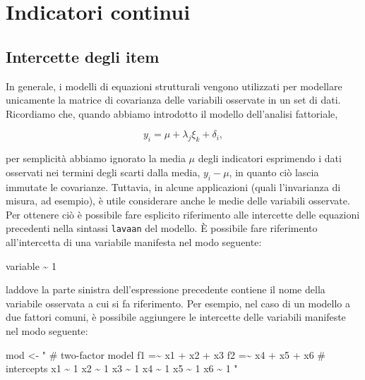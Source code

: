 \documentclass[
  11pt,
]{krantz}
\makeatletter
\newenvironment{Shaded}{\begin{snugshade}}{\end{snugshade}}
\newcommand{\DecValTok}[1]{\textcolor[rgb]{0.06,0.06,0.06}{#1}}
\newcommand{\NormalTok}[1]{#1}
\newcommand{\OtherTok}[1]{\textcolor[rgb]{0.37,0.37,0.37}{#1}}
\newcommand{\SpecialCharTok}[1]{\textcolor[rgb]{0,0,0}{#1}}
\newcommand{\StringTok}[1]{\textcolor[rgb]{0.5,0.5,0.5}{#1}}
\newenvironment{kframe}{%
\medskip{}
\setlength{\fboxsep}{.8em}
 \def\at@end@of@kframe{}%
 \ifinner\ifhmode%
  \def\at@end@of@kframe{\end{minipage}}%
  \begin{minipage}{\columnwidth}%
 \fi\fi%
 \def\FrameCommand##1{\hskip\@totalleftmargin \hskip-\fboxsep
 \colorbox{shadecolor}{##1}\hskip-\fboxsep
     \hskip-\linewidth \hskip-\@totalleftmargin \hskip\columnwidth}%
 \MakeFramed {\advance\hsize-\width
   \@totalleftmargin\z@ \linewidth\hsize
   \@setminipage}}%
 {\par\unskip\endMakeFramed%
 \at@end@of@kframe}
\renewenvironment{Shaded}{\begin{kframe}}{\end{kframe}}
\theoremstyle{definition}
\theoremstyle{definition}
\theoremstyle{definition}
\theoremstyle{definition}
\theoremstyle{remark}
\makeatother
\begin{document}
\hypertarget{indicatori-continui}{%
\section{Indicatori continui}\label{indicatori-continui}}

\hypertarget{intercette-degli-item}{%
\subsection{Intercette degli item}\label{intercette-degli-item}}

In generale, i modelli di equazioni strutturali vengono utilizzati per modellare unicamente la matrice di covarianza delle variabili osservate in un set di dati. Ricordiamo che, quando abbiamo introdotto il modello dell'analisi fattoriale,

\[
y_i = \mu + \lambda_j \xi_k + \delta_i,
\]

per semplicità abbiamo ignorato la media \(\mu\) degli indicatori esprimendo i dati osservati nei termini degli scarti dalla media, \(y_i -\mu\), in quanto ciò lascia immutate le covarianze. Tuttavia, in alcune applicazioni (quali l'invarianza di misura, ad esempio), è utile considerare anche le medie delle variabili osservate. Per ottenere ciò è possibile fare esplicito riferimento alle intercette delle equazioni precedenti nella sintassi \texttt{lavaan} del modello. È possibile fare riferimento all'intercetta di una variabile manifesta nel modo seguente:

\begin{Shaded}
\begin{Highlighting}[]
\NormalTok{variable }\SpecialCharTok{\textasciitilde{}} \DecValTok{1}
\end{Highlighting}
\end{Shaded}

laddove la parte sinistra dell'espressione precedente contiene il nome della variabile osservata a cui si fa riferimento. Per esempio, nel caso di un modello a due fattori comuni, è possibile aggiungere le intercette delle variabili manifeste nel modo seguente:

\begin{Shaded}
\begin{Highlighting}[]
\NormalTok{mod }\OtherTok{\textless{}{-}} \StringTok{"}
\StringTok{  \# two{-}factor model}
\StringTok{  f1 =\textasciitilde{} x1 + x2 + x3}
\StringTok{  f2 =\textasciitilde{} x4 + x5 + x6}
\StringTok{  \# intercepts}
\StringTok{  x1 \textasciitilde{} 1}
\StringTok{  x2 \textasciitilde{} 1}
\StringTok{  x3 \textasciitilde{} 1}
\StringTok{  x4 \textasciitilde{} 1}
\StringTok{  x5 \textasciitilde{} 1}
\StringTok{  x6 \textasciitilde{} 1}
\StringTok{"}
\end{Highlighting}
\end{Shaded}
\end{document}
